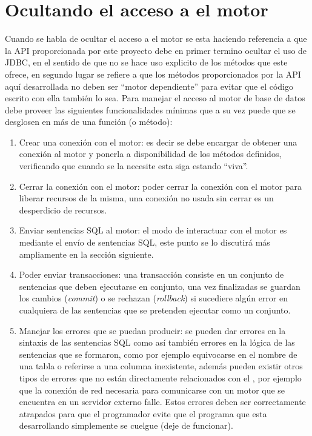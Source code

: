 \section{Ocultando el acceso a el motor}
Cuando se habla de ocultar el acceso a el motor se esta haciendo referencia a que la API proporcionada por este proyecto debe en primer termino ocultar el uso de JDBC, en el sentido de que no se hace uso explicito de los métodos que este ofrece, en segundo lugar se refiere a que los métodos proporcionados por la API aquí desarrollada no deben ser ``motor dependiente'' para evitar que el código escrito con ella también lo sea. Para manejar el acceso al motor de base de datos \jj debe proveer las siguientes funcionalidades mínimas que a su vez puede que se desglosen en más de una función (o método):
%
\begin{enumerate}
%
\item Crear una conexión con el motor: es decir se debe encargar de obtener una conexión al motor y ponerla a disponibilidad de los métodos definidos, verificando que cuando se la necesite esta siga estando ``viva''.
%
\item Cerrar la conexión con el motor: poder cerrar la conexión con el motor para liberar recursos de la misma, una conexión no usada sin cerrar es un desperdicio de recursos.
%
\item Enviar sentencias SQL al motor: el modo de interactuar con el motor es mediante el envío de sentencias SQL, este punto se lo discutirá más ampliamente en la sección siguiente.
%
\item Poder enviar transacciones: una transacción consiste en un conjunto de sentencias que deben ejecutarse en conjunto, una vez finalizadas se guardan los cambios (\textit{commit}) o se rechazan (\textit{rollback}) si sucediere algún error en cualquiera de las sentencias que se pretenden ejecutar como un conjunto.
%
\item Manejar los errores que se puedan producir: se pueden dar errores en la sintaxis de las sentencias SQL como así también errores en la lógica de las sentencias que se formaron, como por ejemplo equivocarse en el nombre de una tabla o referirse a una columna inexistente, además pueden existir otros tipos de errores que no están directamente relacionados con el \dd, por ejemplo que la conexión de red necesaria para comunicarse con un motor que se encuentra en un servidor externo falle. Estos errores deben ser correctamente atrapados para que el programador evite que el programa que esta desarrollando simplemente se cuelgue (deje de funcionar).

\end{enumerate}
